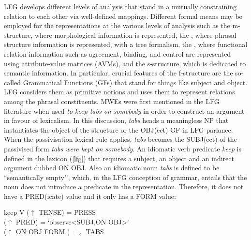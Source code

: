 \documentclass[output=paper]{langsci/langscibook}
\begin{document}
LFG develops different levels of analysis that stand in a mutually constraining relation to each other via well-defined mappings. Different formal means may be employed for the representations at the various levels of analysis such as the m-structure, where morphological information is represented, the , where phrasal structure information is represented, with a tree formalism, the , where  functional relation information such as agreement, binding, and control are represented using attribute-value matrices (AVMs),  and the s-structure, which is dedicated to semantic information. In particular, crucial features of the f-structure are the so-called Grammatical Functions (GFs) that stand for things like subject and object. LFG considers them as primitive notions and uses them to represent relations among the phrasal constituents. 
MWEs were first mentioned in the LFG literature when \citet{Bresnan:82}   used {\em to keep tabs on somebody} in order to construct an argument in favour of  lexicalism.  In this discussion, \textit{tabs} heads a meaningless NP that instantiates the object of the structure or the OBJ(ect) GF in LFG parlance. When the passivisation    lexical rule applies, \textit{tabs} becomes the SUBJ(ect) of the passivised form \textit{tabs were kept on somebody}. An idiomatic verb predicate \textit{keep} is defined in the lexicon (\ref{lfg}) that requires a subject, an object and an indirect argument dubbed ON OBJ.  Also an idiomatic noun \textit{tabs} is defined to be ``semantically empty'’, which, in the LFG conception of grammar, entails that the noun does not introduce a predicate in the representation. Therefore, it does not have a PRED(icate) value and it only has a FORM value:

\ea \label{lfg}
keep  V ($\uparrow$ TENSE) = PRESS\\
          ($\uparrow$ PRED) = `observe<SUBJ,ON OBJ>’\\
          ($\uparrow$ ON OBJ FORM ) $=_c$ TABS\\
\z
\end{document}
